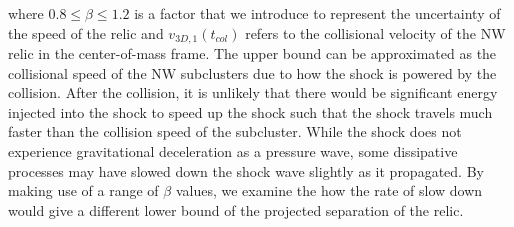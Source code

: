 where $0.8 \leq \beta \leq 1.2$ is a factor that we introduce to represent the
uncertainty of the speed of the relic and $v_{3D,1}(t_{col})$ refers to the collisional velocity of
the NW relic in the center-of-mass frame. The upper bound can be
approximated as the collisional speed of the NW subclusters due to how the
shock is powered by the collision. After the collision, it is unlikely that
there would be significant energy injected into the shock to speed up the
shock such that the shock travels much faster than the collision speed of the subcluster. While the shock does not experience gravitational deceleration as a
pressure wave, some dissipative processes may have slowed down the shock
wave slightly as it propagated. By making use of a
range of $\beta$ values, we examine the how the rate of slow down would
give a different lower bound of the projected separation of the relic.   








